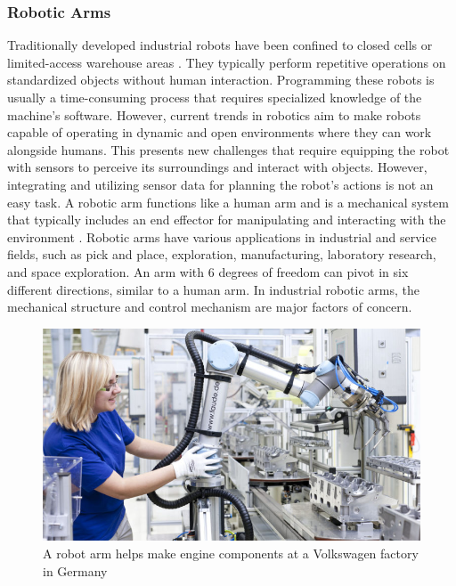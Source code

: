\documentclass[12pt,oneside]{article}
\begin{document}
\subsubsection{Robotic Arms}
Traditionally developed industrial robots have been confined to closed cells or limited-access warehouse areas \cite{9_lucchi2020robo}. They typically perform repetitive operations on standardized objects without human interaction. Programming these robots is usually a time-consuming process that requires specialized knowledge of the machine's software. However, current trends in robotics aim to make robots capable of operating in dynamic and open environments where they can work alongside humans. This presents new challenges that require equipping the robot with sensors to perceive its surroundings and interact with objects. However, integrating and utilizing sensor data for planning the robot's actions is not an easy task.
A robotic arm functions like a human arm and is a mechanical system that typically includes an end effector for manipulating and interacting with the environment \cite{10_ohta2018design}. Robotic arms have various applications in industrial and service fields, such as pick and place, exploration, manufacturing, laboratory research, and space exploration. An arm with 6 degrees of freedom can pivot in six different directions, similar to a human arm. In industrial robotic arms, the mechanical structure and control mechanism are major factors of concern.
\begin{figure}[H]
\centering
\includegraphics[width=0.9\linewidth]{robotic_arm_real_world}
\caption{A robot arm helps make engine components at a Volkswagen factory in Germany \cite{wamu2013}}
\label{fig:roboticarmrealworld}
\end{figure}
\end{document}
